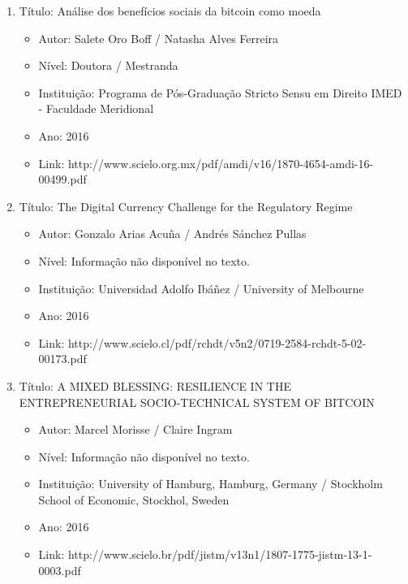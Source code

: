 \documentclass[12pt]{article}
\begin{document}
\begin{enumerate}

\item Título: Análise dos benefícios sociais da bitcoin como moeda

\begin{itemize}

\item Autor: Salete Oro Boff / Natasha Alves Ferreira

\item Nível: Doutora / Mestranda

\item Instituição: Programa de Pós-Graduação Stricto Sensu em Direito IMED - Faculdade Meridional

\item Ano: 2016

\item Link: http://www.scielo.org.mx/pdf/amdi/v16/1870-4654-amdi-16-00499.pdf

\end{itemize}


\item Título: The Digital Currency Challenge for the Regulatory Regime
\begin{itemize}

\item Autor: 
Gonzalo Arias Acuña / Andrés Sánchez Pullas
\item Nível: Informação não disponível no texto.
\item Instituição: Universidad Adolfo Ibáñez / University of Melbourne
\item Ano: 
2016
\item Link: 
http://www.scielo.cl/pdf/rchdt/v5n2/0719-2584-rchdt-5-02-00173.pdf
\end{itemize}


\item Título: A MIXED BLESSING: RESILIENCE IN THE ENTREPRENEURIAL SOCIO-TECHNICAL SYSTEM OF BITCOIN
\begin{itemize}

\item Autor: 
Marcel Morisse / Claire Ingram
\item Nível: Informação não disponível no texto.
\item Instituição: University of Hamburg, Hamburg, Germany / Stockholm School of Economic, Stockhol, Sweden
\item Ano: 
2016
\item Link: 
http://www.scielo.br/pdf/jistm/v13n1/1807-1775-jistm-13-1-0003.pdf
\end{itemize}



\end{enumerate}
\end{document}
